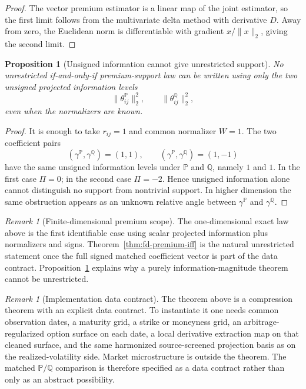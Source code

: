 \documentclass[11pt,a4paper]{amsart}
\theoremstyle{plain}
\newtheorem{proposition}[theorem]{Proposition}
\theoremstyle{definition}
\theoremstyle{remark}
\newtheorem{remark}[theorem]{Remark}
\newcommand{\PP}{\mathbb{P}}
\newcommand{\QQ}{\mathbb{Q}}
\begin{document}
\begin{proof}
The vector premium estimator is a linear map of the joint estimator, so the first limit follows
from the multivariate delta method with derivative \(D\).  Away from zero, the Euclidean norm is
differentiable with gradient \(x/\|x\|_2\), giving the second limit.
\end{proof}

\begin{proposition}[Unsigned information cannot give unrestricted support]\label{prop:premium-nonidentification}
No unrestricted if-and-only-if premium-support law can be written using only the two unsigned
projected information levels
\[
        \|\theta_{ij}^\PP\|_2^2,
        \qquad
        \|\theta_{ij}^\QQ\|_2^2,
\]
even when the normalizers are known.
\end{proposition}

\begin{proof}
It is enough to take \(r_{ij}=1\) and common normalizer \(W=1\).  The two coefficient pairs
\[
        (\gamma^\PP,\gamma^\QQ)=(1,1),
        \qquad
        (\gamma^\PP,\gamma^\QQ)=(1,-1)
\]
have the same unsigned information levels under \(\PP\) and \(\QQ\), namely \(1\) and \(1\).  In
the first case \(\Pi=0\); in the second case \(\Pi=-2\).  Hence unsigned information alone cannot
distinguish no support from nontrivial support.  In higher dimension the same obstruction appears
as an unknown relative angle between \(\gamma^\PP\) and \(\gamma^\QQ\).
\end{proof}

\begin{remark}[Finite-dimensional premium scope]\label{rem:fd-premium-scope}
The one-dimensional exact law above is the first identifiable case using scalar projected
information plus normalizers and signs.  Theorem~\ref{thm:fd-premium-iff} is the natural
unrestricted statement once the full signed matched coefficient vector is part of the data
contract.  Proposition~\ref{prop:premium-nonidentification} explains why a purely
information-magnitude theorem cannot be unrestricted.
\end{remark}

\begin{remark}[Implementation data contract]
The theorem above is a compression theorem with an explicit data contract.  To instantiate it one
needs common observation dates, a maturity grid, a strike or moneyness grid, an
arbitrage-regularized option surface on each date, a local derivative extraction map on that cleaned
surface, and the same harmonized source-screened projection basis as on the realized-volatility
side.  Market microstructure is outside the theorem.  The matched \(\PP/\QQ\) comparison is therefore specified as a
data contract rather than only as an abstract possibility.
\end{remark}
\end{document}
